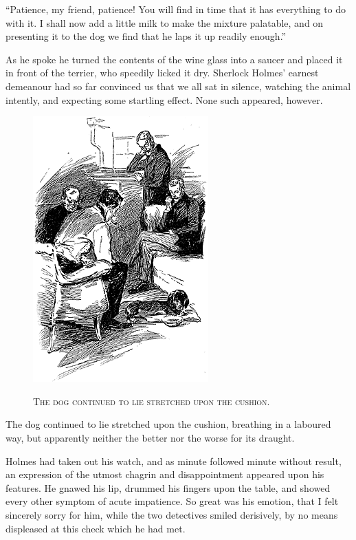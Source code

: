 \documentclass[12pt,english]{book}
\newcommand{\noun}[1]{\textsc{#1}}
\begin{document}
{}``Patience, my friend, patience! You will find in time that it
has everything to do with it. I shall now add a little milk to make
the mixture palatable, and on presenting it to the dog we find that
he laps it up readily enough.''

As he spoke he turned the contents of the wine glass into a saucer
and placed it in front of the terrier, who speedily licked it dry.
Sherlock Holmes' earnest demeanour had so far convinced us that we
all sat in silence, watching the animal intently, and expecting some
startling effect. None such appeared, however. %
\begin{figure}[htbp]
\noindent \begin{center}\includegraphics{images/study10-stud-12.png}\end{center}

\noindent \begin{center}\noun{The dog continued to lie stretched
upon the cushion.}\end{center}
\end{figure}
The dog continued to lie stretched upon the cushion, breathing in
a laboured way, but apparently neither the better nor the worse for
its draught.

Holmes had taken out his watch, and as minute followed minute without
result, an expression of the utmost chagrin and disappointment appeared
upon his features. He gnawed his lip, drummed his fingers upon the
table, and showed every other symptom of acute impatience. So great
was his emotion, that I felt sincerely sorry for him, while the two
detectives smiled derisively, by no means displeased at this check
which he had met.
\end{document}
